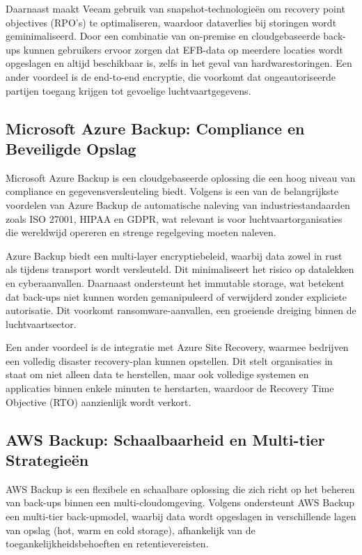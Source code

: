 Daarnaast maakt Veeam gebruik van snapshot-technologieën om recovery point objectives (RPO's) te optimaliseren, waardoor dataverlies bij storingen wordt geminimaliseerd. Door een combinatie van on-premise en cloudgebaseerde back-ups kunnen gebruikers ervoor zorgen dat EFB-data op meerdere locaties wordt opgeslagen en altijd beschikbaar is, zelfs in het geval van hardwarestoringen. Een ander voordeel is de end-to-end encryptie, die voorkomt dat ongeautoriseerde partijen toegang krijgen tot gevoelige luchtvaartgegevens.

\subsection{Microsoft Azure Backup: Compliance en Beveiligde Opslag}
\label{subsec:azure}

Microsoft Azure Backup is een cloudgebaseerde oplossing die een hoog niveau van compliance en gegevensversleuteling biedt. Volgens \textcite{MicrosoftBackup} is een van de belangrijkste voordelen van Azure Backup de automatische naleving van industriestandaarden zoals ISO 27001, HIPAA en GDPR, wat relevant is voor luchtvaartorganisaties die wereldwijd opereren en strenge regelgeving moeten naleven.

Azure Backup biedt een multi-layer encryptiebeleid, waarbij data zowel in rust als tijdens transport wordt versleuteld. Dit minimaliseert het risico op datalekken en cyberaanvallen. Daarnaast ondersteunt het immutable storage, wat betekent dat back-ups niet kunnen worden gemanipuleerd of verwijderd zonder expliciete autorisatie. Dit voorkomt ransomware-aanvallen, een groeiende dreiging binnen de luchtvaartsector. 

Een ander voordeel is de integratie met Azure Site Recovery, waarmee bedrijven een volledig disaster recovery-plan kunnen opstellen. Dit stelt organisaties in staat om niet alleen data te herstellen, maar ook volledige systemen en applicaties binnen enkele minuten te herstarten, waardoor de Recovery Time Objective (RTO) aanzienlijk wordt verkort.

\subsection{AWS Backup: Schaalbaarheid en Multi-tier Strategieën}
\label{subsec:aws}

AWS Backup is een flexibele en schaalbare oplossing die zich richt op het beheren van back-ups binnen een multi-cloudomgeving. Volgens \textcite{AWSBackup} ondersteunt AWS Backup een multi-tier back-upmodel, waarbij data wordt opgeslagen in verschillende lagen van opslag (hot, warm en cold storage), afhankelijk van de toegankelijkheidsbehoeften en retentievereisten.

